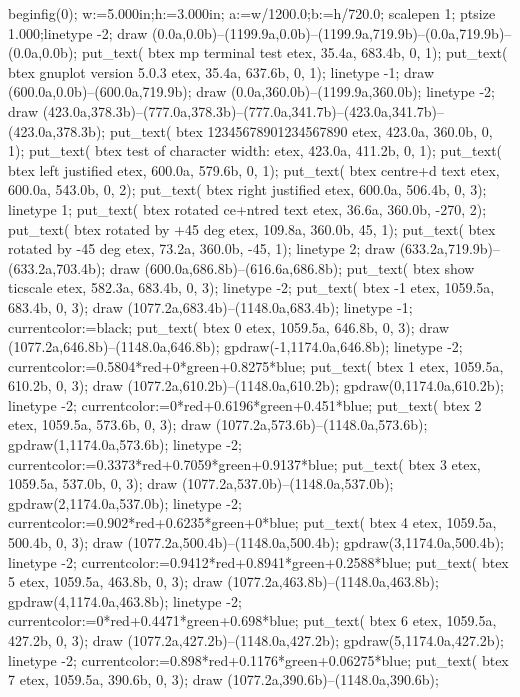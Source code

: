 beginfig(0);
w:=5.000in;h:=3.000in;
a:=w/1200.0;b:=h/720.0;
scalepen 1; ptsize 1.000;linetype -2;
draw (0.0a,0.0b)--(1199.9a,0.0b)--(1199.9a,719.9b)--(0.0a,719.9b)--(0.0a,0.0b);
put_text( btex mp  terminal test etex, 35.4a, 683.4b, 0, 1);
put_text( btex gnuplot version 5.0.3   etex, 35.4a, 637.6b, 0, 1);
linetype -1;
draw (600.0a,0.0b)--(600.0a,719.9b);
draw (0.0a,360.0b)--(1199.9a,360.0b);
linetype -2;
draw (423.0a,378.3b)--(777.0a,378.3b)--(777.0a,341.7b)--(423.0a,341.7b)--(423.0a,378.3b);
put_text( btex 12345678901234567890 etex, 423.0a, 360.0b, 0, 1);
put_text( btex test of character width: etex, 423.0a, 411.2b, 0, 1);
put_text( btex left justified etex, 600.0a, 579.6b, 0, 1);
put_text( btex centre+d text etex, 600.0a, 543.0b, 0, 2);
put_text( btex right justified etex, 600.0a, 506.4b, 0, 3);
linetype 1;
put_text( btex rotated ce+ntred text etex, 36.6a, 360.0b, -270, 2);
put_text( btex  rotated by +45 deg etex, 109.8a, 360.0b, 45, 1);
put_text( btex  rotated by -45 deg etex, 73.2a, 360.0b, -45, 1);
linetype 2;
draw (633.2a,719.9b)--(633.2a,703.4b);
draw (600.0a,686.8b)--(616.6a,686.8b);
put_text( btex show ticscale etex, 582.3a, 683.4b, 0, 3);
linetype -2;
put_text( btex -1 etex, 1059.5a, 683.4b, 0, 3);
draw (1077.2a,683.4b)--(1148.0a,683.4b);
linetype -1;
currentcolor:=black;
put_text( btex 0 etex, 1059.5a, 646.8b, 0, 3);
draw (1077.2a,646.8b)--(1148.0a,646.8b);
gpdraw(-1,1174.0a,646.8b);
linetype -2;
currentcolor:=0.5804*red+0*green+0.8275*blue;
put_text( btex 1 etex, 1059.5a, 610.2b, 0, 3);
draw (1077.2a,610.2b)--(1148.0a,610.2b);
gpdraw(0,1174.0a,610.2b);
linetype -2;
currentcolor:=0*red+0.6196*green+0.451*blue;
put_text( btex 2 etex, 1059.5a, 573.6b, 0, 3);
draw (1077.2a,573.6b)--(1148.0a,573.6b);
gpdraw(1,1174.0a,573.6b);
linetype -2;
currentcolor:=0.3373*red+0.7059*green+0.9137*blue;
put_text( btex 3 etex, 1059.5a, 537.0b, 0, 3);
draw (1077.2a,537.0b)--(1148.0a,537.0b);
gpdraw(2,1174.0a,537.0b);
linetype -2;
currentcolor:=0.902*red+0.6235*green+0*blue;
put_text( btex 4 etex, 1059.5a, 500.4b, 0, 3);
draw (1077.2a,500.4b)--(1148.0a,500.4b);
gpdraw(3,1174.0a,500.4b);
linetype -2;
currentcolor:=0.9412*red+0.8941*green+0.2588*blue;
put_text( btex 5 etex, 1059.5a, 463.8b, 0, 3);
draw (1077.2a,463.8b)--(1148.0a,463.8b);
gpdraw(4,1174.0a,463.8b);
linetype -2;
currentcolor:=0*red+0.4471*green+0.698*blue;
put_text( btex 6 etex, 1059.5a, 427.2b, 0, 3);
draw (1077.2a,427.2b)--(1148.0a,427.2b);
gpdraw(5,1174.0a,427.2b);
linetype -2;
currentcolor:=0.898*red+0.1176*green+0.06275*blue;
put_text( btex 7 etex, 1059.5a, 390.6b, 0, 3);
draw (1077.2a,390.6b)--(1148.0a,390.6b);
